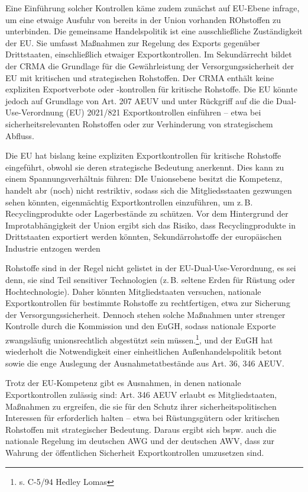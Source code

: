 \documentclass[12pt,a4paper,oneside]{book} %
\begin{document}
Eine Einführung solcher Kontrollen käme zudem zunächst auf EU-Ebene infrage, um eine etwaige Ausfuhr von bereits in der Union vorhanden ROhstoffen zu unterbinden. Die gemeinsame Handelspolitik ist eine ausschließliche Zuständigkeit der EU. Sie umfasst Maßnahmen zur Regelung des Exports gegenüber Drittstaaten, einschließlich etwaiger Exportkontrollen. Im Sekundärrecht bildet der CRMA die Grundlage für die Gewährleistung der Versorgungssicherheit der EU mit kritischen und strategischen Rohstoffen. Der CRMA enthält keine expliziten Exportverbote oder -kontrollen für kritische Rohstoffe. Die EU könnte jedoch auf Grundlage von Art. 207 AEUV und unter Rückgriff auf die die Dual-Use-Verordnung (EU) 2021/821 Exportkontrollen einführen – etwa bei sicherheitsrelevanten Rohstoffen oder zur Verhinderung von strategischem Abfluss.

Die EU hat bislang keine expliziten Exportkontrollen für kritische Rohstoffe eingeführt, obwohl sie deren strategische Bedeutung anerkennt. Dies kann zu einem Spannungsverhältnis führen: DIe Unionsebene besitzt die Kompetenz, handelt abr (noch) nicht restriktiv, sodass sich die Mitgliedsstaaten gezwungen  sehen könnten, eigenmächtig Exportkontrollen einzuführen, um z. B. Recyclingprodukte oder Lagerbestände zu schützen. Vor dem Hintergrund der Improtabhängigkeit der Union ergibt sich das Risiko, dass Recyclingprodukte in Drittstaaten exportiert werden könnten, Sekundärrohstoffe der europäischen Industrie entzogen werden

Rohstoffe sind in der Regel nicht gelistet in der EU-Dual-Use-Verordnung, es sei denn, sie sind Teil sensitiver Technologien (z. B. seltene Erden für Rüstung oder Hochtechnologie). Daher könnten Mitgliedstaaten versuchen, nationale Exportkontrollen für bestimmte Rohstoffe zu rechtfertigen, etwa zur Sicherung der Versorgungssicherheit. Dennoch stehen solche Maßnahmen unter strenger Kontrolle durch die Kommission und den EuGH, sodass nationale Exporte zwangsläufig unionsrechtlich abgestützt sein müssen.\footnote{s. C-5/94 Hedley Lomas}, und der EuGH hat wiederholt die Notwendigkeit einer einheitlichen Außenhandelspolitik betont sowie die enge Auslegung der Ausnahmetatbestände aus Art. 36, 346 AEUV.


Trotz der EU-Kompetenz gibt es Ausnahmen, in denen nationale Exportkontrollen zulässig sind: Art. 346 AEUV erlaubt es Mitgliedstaaten, Maßnahmen zu ergreifen, die sie für den Schutz ihrer sicherheitspolitischen Interessen für erforderlich halten – etwa bei Rüstungsgütern oder kritischen Rohstoffen mit strategischer Bedeutung. Daraus ergibt sich bspw. auch die nationale Regelung im deutschen AWG und der deutschen AWV, dass zur Wahrung der öffentlichen Sicherheit Exportkontrollen umzusetzen sind.
\end{document}
